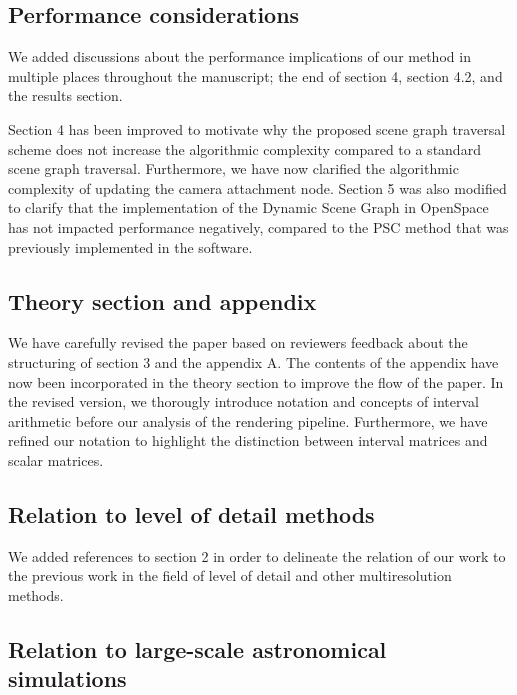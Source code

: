 \documentclass{article}
\begin{document}


\subsection{Performance considerations}\label{concern:performance}
We added discussions about the performance implications of our method in multiple places
throughout the manuscript;  the end of section 4, section 4.2, and the results section.

Section 4 has been improved to motivate why the proposed scene graph traversal scheme does not increase the algorithmic complexity compared to a standard scene graph traversal.
Furthermore, we have now clarified the algorithmic complexity of updating the camera attachment node.
Section 5 was also modified to clarify that the implementation of the Dynamic Scene Graph in OpenSpace has not impacted performance negatively, compared to the PSC method that was previously implemented in the software.

\subsection{Theory section and appendix}\label{concern:structure}
We have carefully revised the paper based on reviewers feedback about the structuring of section 3 and the appendix A.
The contents of the appendix have now been incorporated in the theory section to improve the flow of the paper. In the revised version, we thorougly introduce notation and concepts of interval arithmetic before our analysis of the rendering pipeline. Furthermore, we have refined our notation to highlight the distinction between interval matrices and scalar matrices.

\subsection{Relation to level of detail methods}\label{concern:lod}
We added references to section 2 in order to delineate the relation of our work to the 
previous work in the field of level of detail and other multiresolution methods.

\subsection{Relation to large-scale astronomical simulations}\label{concern:simulations}
\end{document}
